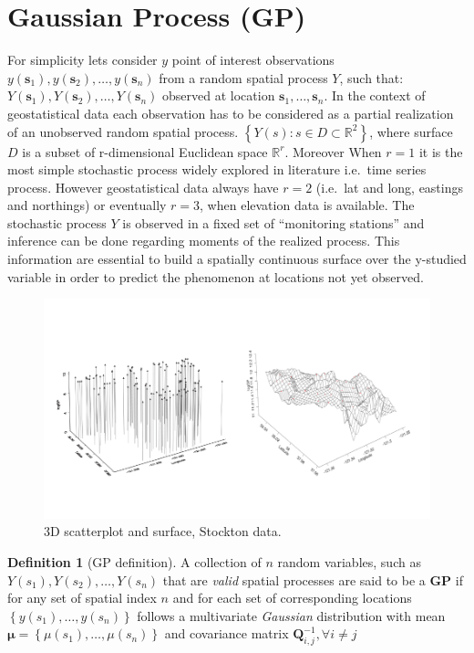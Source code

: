 \documentclass[
  12pt,
  a4paper,
  oneside]{book}
\theoremstyle{definition}
\newtheorem{definition}{Definition}[chapter]
\theoremstyle{definition}
\theoremstyle{definition}
\theoremstyle{remark}
\begin{document}
\hypertarget{GP}{%
\section{Gaussian Process (GP)}\label{GP}}

For simplicity lets consider \(y\) point of interest observations \(y\left(\boldsymbol{s}_{1}\right),y\left(\boldsymbol{s}_{2}\right), \ldots, y\left(\boldsymbol{s}_{n}\right)\)
from a random spatial process \(Y\), such that: \(Y\left(\boldsymbol{s}_{1}\right),Y\left(\boldsymbol{s}_{2}\right), \ldots, Y\left(\boldsymbol{s}_{n}\right)\) observed at location \(\boldsymbol{s}_{1}, \ldots, \boldsymbol{s}_{n}\). In the context of geostatistical data each observation has to be considered as a partial realization of an unobserved random spatial process.
\(\left\{Y(s): s \in D \subset \mathbb{R}^{2}\right\}\), where surface \(D\) is a subset of r-dimensional Euclidean space \(\mathbb{R}^{r}\).
Moreover When \(r = 1\) it is the most simple stochastic process widely explored in literature i.e.~time series process. However geostatistical data always have \(r = 2\) (i.e.~lat and long, eastings and northings) or eventually \(r = 3\), when elevation data is available. The stochastic process \(Y\) is observed in a fixed set of ``monitoring stations'' and inference can be done regarding moments of the realized process. This information are essential to build a spatially continuous surface over the y-studied variable in order to predict the phenomenon at locations not yet observed.

\begin{figure}
\centering
\includegraphics{images/prdprocess.png}
\caption{3D scatterplot and surface, Stockton data.}
\end{figure}

\begin{definition}[GP definition]
\protect\hypertarget{def:GP}{}{\label{def:GP} {} }A collection of \(n\) random variables, such as \(Y(s_{1}), Y(s_{2}) , \ldots, Y(s_{n})\) that are \emph{valid} spatial processes are said to be a \textbf{GP} if for any set of spatial index \(n\) and for each set of corresponding locations \(\left\{y\left(s_{1}\right), \ldots, y\left(s_{n}\right)\right\}\) follows a multivariate \emph{Gaussian} distribution with mean \(\boldsymbol{\mu}=\left\{\mu\left(s_{1}\right), \ldots, \mu\left(s_{n}\right)\right\}\) and covariance matrix \(\mathbf{Q}^{-1}_{i,j}, \forall i \neq j\)
\end{definition}
\end{document}
